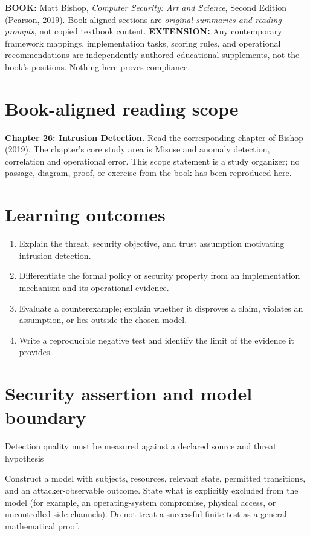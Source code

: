 \documentclass[10pt,letterpaper]{article}
\begin{document}
\makedoctocpage
\begin{notebox}
\textbf{BOOK:} Matt Bishop, \emph{Computer Security: Art and Science}, Second Edition (Pearson, 2019). Book-aligned sections are \emph{original summaries and reading prompts}, not copied textbook content.
\textbf{EXTENSION:} Any contemporary framework mappings, implementation tasks, scoring rules, and operational recommendations are independently authored educational supplements, not the book's positions. Nothing here proves compliance.
\end{notebox}
\section{Book-aligned reading scope}
\textbf{Chapter 26: Intrusion Detection.} Read the corresponding chapter of Bishop (2019). The chapter's core study area is Misuse and anomaly detection, correlation and operational error. This scope statement is a study organizer; no passage, diagram, proof, or exercise from the book has been reproduced here.
\section{Learning outcomes}
\begin{enumerate}
\item Explain the threat, security objective, and trust assumption motivating intrusion detection.
\item Differentiate the formal policy or security property from an implementation mechanism and its operational evidence.
\item Evaluate a counterexample; explain whether it disproves a claim, violates an assumption, or lies outside the chosen model.
\item Write a reproducible negative test and identify the limit of the evidence it provides.
\end{enumerate}
\section{Security assertion and model boundary}
\begin{infobox}
Detection quality must be measured against a declared source and threat hypothesis
\end{infobox}
Construct a model with subjects, resources, relevant state, permitted transitions, and an attacker-observable outcome. State what is explicitly excluded from the model (for example, an operating-system compromise, physical access, or uncontrolled side channels). Do not treat a successful finite test as a general mathematical proof.
\end{document}
